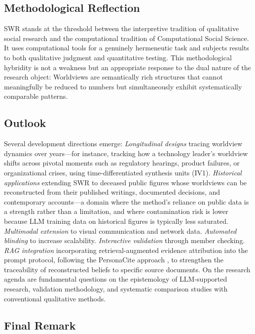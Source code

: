 \documentclass[11pt,a4paper]{article}
\theoremstyle{definition}
\theoremstyle{plain}
\theoremstyle{remark}
\begin{document}
\subsection{Methodological Reflection}

SWR stands at the threshold between the interpretive tradition of qualitative social research and the computational tradition of Computational Social Science. It uses computational tools for a genuinely hermeneutic task and subjects results to both qualitative judgment and quantitative testing. This methodological hybridity is not a weakness but an appropriate response to the dual nature of the research object: Worldviews are semantically rich structures that cannot meaningfully be reduced to numbers but simultaneously exhibit systematically comparable patterns.

\subsection{Outlook}

Several development directions emerge: \emph{Longitudinal designs} tracing worldview dynamics over years---for instance, tracking how a technology leader's worldview shifts across pivotal moments such as regulatory hearings, product failures, or organizational crises, using time-differentiated synthesis units (IV1). \emph{Historical applications} extending SWR to deceased public figures whose worldviews can be reconstructed from their published writings, documented decisions, and contemporary accounts---a domain where the method's reliance on public data is a strength rather than a limitation, and where contamination risk is lower because LLM training data on historical figures is typically less saturated. \emph{Multimodal extension} to visual communication and network data. \emph{Automated blinding} to increase scalability. \emph{Interactive validation} through member checking. \emph{RAG integration} incorporating retrieval-augmented evidence attribution into the prompt protocol, following the PersonaCite approach \citep{PersonaCite2026}, to strengthen the traceability of reconstructed beliefs to specific source documents. On the research agenda are fundamental questions on the epistemology of LLM-supported research, validation methodology, and systematic comparison studies with conventional qualitative methods.

\subsection{Final Remark}
\end{document}
